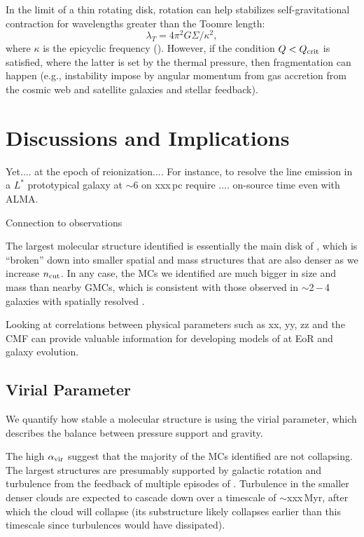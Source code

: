 \documentclass[apj]{emulateapj} %
\begin{document}
In the limit of a thin rotating disk, rotation can help stabilizes self-gravitational contraction for wavelengths greater than the Toomre length:
\begin{equation}
\lambda_T = 4\pi^2 G\Sigma/\kappa^2,
\end{equation} 
where $\kappa$ is the epicyclic frequency (\citealt{Toomre64a}).
However, if the condition $Q<Q_{\rm crit}$ is satisfied, where the latter is set by 
the thermal pressure, then fragmentation can happen 
(e.g., instability impose by angular momentum from gas accretion from the cosmic web and 
satellite galaxies and stellar feedback).



\section{Discussions and Implications}     \label{sec:diss}
Yet.... at the epoch of reionization.... For instance, to resolve the 
\aco line emission in a $L^*$ prototypical galaxy at \z$\sim$6 on xxx\,pc 
require .... on-source time even with ALMA. 

Connection to observations

The largest molecular structure identified is essentially the main disk of \flower, which is ``broken'' down into smaller 
spatial and mass structures that are also denser as we increase $n_{\rm cut}$. In any case,
the MCs we identified are much bigger in size and mass than nearby GMCs, which is consistent with 
those observed in \z$\sim$2\,$-$\,4 galaxies with spatially resolved \obs.

Looking at correlations between physical parameters such as xx, yy, zz and the CMF 
can provide valuable information for developing models of \SF at EoR and 
galaxy evolution.


\subsection{Virial Parameter}
We quantify how stable a molecular structure is using the virial parameter, which 
describes the balance between pressure support and gravity. 

The high $\alpha_{\rm vir}$ suggest that the majority of the MCs identified are not collapsing. 
The largest structures are presumably supported by galactic rotation and turbulence from the feedback of 
multiple episodes of \SF.
Turbulence in the smaller denser clouds are expected to cascade down over a timescale of $\sim$xxx\,Myr, after which the cloud will collapse 
(its substructure likely collapses earlier than this timescale since turbulences would have dissipated). 
\end{document}
